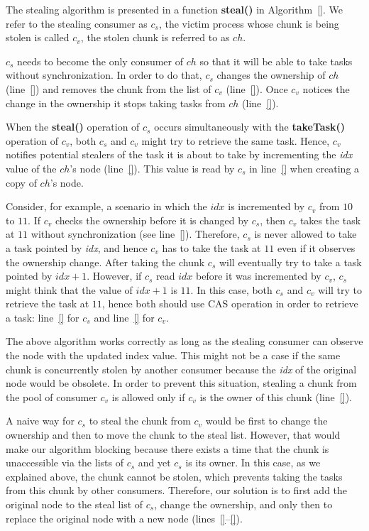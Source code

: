 The stealing algorithm is presented in a function {\bf steal()} in Algorithm~\ref{}. 
We refer to the stealing consumer as $c_s$, the victim process whose chunk is being stolen is called $c_v$, the stolen chunk is referred to as $ch$.

$c_s$ needs to become the only consumer of $ch$ so that it will be able to take tasks without synchronization. 
In order to do that, $c_s$ changes the ownership of $ch$ (line~\ref{}) and removes the chunk from the list of $c_v$ (line~\ref{}). 
Once $c_v$ notices the change in the ownership it stops taking tasks from $ch$ (line~\ref{}). 

When the {\bf steal()} operation of $c_s$ occurs simultaneously with the {\bf takeTask()} operation of $c_v$, both $c_s$ and $c_v$ might try to retrieve the same task. Hence, $c_v$ notifies potential stealers of the task it is about to take by incrementing the \emph{idx} value of the $ch$'s node (line~\ref{}). This value is read by $c_s$ in line~\ref{} when creating a copy of $ch$'s node.

Consider, for example, a scenario in which the $idx$ is incremented by $c_v$ from $10$ to $11$. 
If $c_v$ checks the ownership before it is changed by $c_s$, then $c_v$ takes the task at $11$ without synchronization (see line~\ref{}). Therefore, $c_s$ is never allowed to take a task pointed by \emph{idx}, and hence $c_v$ has to take the task at $11$ even if it observes the ownership change. 
After taking the chunk $c_s$ will eventually try to take a task pointed by $idx+1$. However, if $c_s$ read $idx$ before it was incremented by $c_v$, $c_s$ might think that the value of $idx+1$ is $11$. In this case, both $c_s$ and $c_v$ will try to retrieve the task at $11$, hence both should use CAS operation in order to retrieve a task: line~\ref{} for $c_s$ and line~\ref{} for $c_v$. 

The above algorithm works correctly as long as the stealing consumer can observe the node with the updated index value. 
This might not be a case if the same chunk is concurrently stolen by another consumer because the \emph{idx} of the original node would be obsolete. 
In order to prevent this situation, stealing a chunk from the pool of consumer $c_v$ is allowed only if $c_v$ is the owner of this chunk (line~\ref{}). 

A naive way for $c_s$ to steal the chunk from $c_v$ would be first to change the ownership and then to move the chunk to the steal list. However, that would make our algorithm blocking because there exists a time that the chunk is unaccessible via the lists of $c_s$ and yet $c_s$ is its owner. In this case, as we explained above, the chunk cannot be stolen, which prevents taking the tasks from this chunk by other consumers. Therefore, our solution is to first add the original node to the steal list of $c_s$, change the ownership, and only then to replace the original node with a new node (lines~\ref{}--\ref{}). 
 

